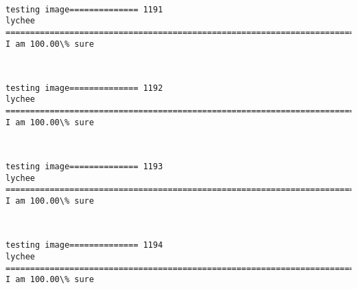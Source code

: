 \documentclass[11pt]{article}
\begin{document}
    \begin{center}
    \end{center}
    { \hspace*{\fill} \\}
    
    \begin{Verbatim}[commandchars=\\\{\}]
testing image============== 1191
lychee
============================================================================
I am 100.00\% sure

    \end{Verbatim}

    \begin{center}
    \end{center}
    { \hspace*{\fill} \\}
    
    \begin{Verbatim}[commandchars=\\\{\}]
testing image============== 1192
lychee
============================================================================
I am 100.00\% sure

    \end{Verbatim}

    \begin{center}
    \end{center}
    { \hspace*{\fill} \\}
    
    \begin{Verbatim}[commandchars=\\\{\}]
testing image============== 1193
lychee
============================================================================
I am 100.00\% sure

    \end{Verbatim}

    \begin{center}
    \end{center}
    { \hspace*{\fill} \\}
    
    \begin{Verbatim}[commandchars=\\\{\}]
testing image============== 1194
lychee
============================================================================
I am 100.00\% sure

    \end{Verbatim}
\end{document}
